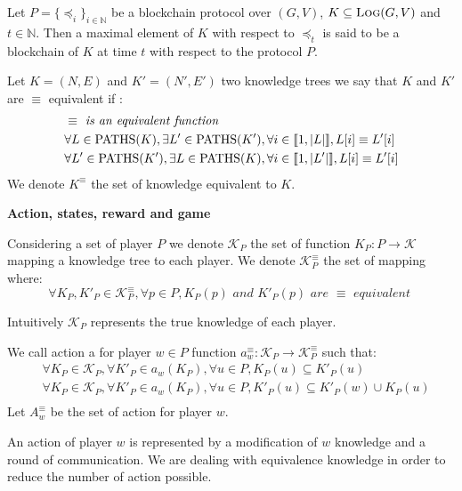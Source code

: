 
\begin{mydef}
Let $P = \{ \preceq_i\}_{i \in \mathbb{N}}$ be a blockchain protocol over $(G,V)$, $K \subseteq \text{\sc Log}(G,V)$ and $t \in \mathbb{N}$. 
Then a maximal element of $K$ with respect to $\preceq_t$ is said to be a blockchain of $K$ at time $t$ with respect to the protocol $P$.
\end{mydef}



\begin{mydef}
	Let $K = (N,E)$ and $K'=(N',E')$ two knowledge trees we say that $K$ and $K'$ are $\equiv$ equivalent if :
	\begin{eqnarray*}
		& \equiv \textit{ is an equivalent function} \\
		& \forall L \in \text{PATHS}(K), \exists L' \in \text{PATHS}(K'), \forall i \in \llbracket 1,|L| \rrbracket, L[i] \equiv L'[i] \\
		& \forall L' \in \text{PATHS}(K'), \exists L \in \text{PATHS}(K), \forall i \in \llbracket 1,|L'| \rrbracket, L[i] \equiv L'[i] \\
	\end{eqnarray*}	
	We denote $K^{\equiv}$ the set of knowledge equivalent to $K$. 
\end{mydef}


\medskip
\noindent
\textbf{Action, states, reward and game}
\begin{mydef}
	Considering a set of player $P$ we denote $\mathcal{K}_P$ the set of function $K_P : P \rightarrow \mathcal{K}$ mapping a knowledge tree to each player. 
	We denote $\mathcal{K}^{\equiv}_P$ the set of mapping where:
	$$\forall K_P, K'_P \in \mathcal{K}^{\equiv}_P, \forall p \in P, K_P(p) \textit{ and } K'_P(p) \textit{ are } \equiv \textit{ equivalent } $$ 
\end{mydef}

Intuitively $\mathcal{K}_P$ represents the true knowledge of each player.

\begin{mydef}
	We call action a for player $w\in P$ function $a^\equiv_w: \mathcal{K}_P \rightarrow \mathcal{K}_P^{\equiv}$ such that: 
	\begin{eqnarray*}	
		&\forall K_P \in \mathcal{K}_P, \forall K'_P \in a_w(K_P),  \forall u \in P, K_P(u) \subseteq K'_P(u)  \\
		&\forall K_P \in \mathcal{K}_P, \forall K'_P \in a_w(K_P), \forall u \in P, K'_P(u) \subseteq K'_P(w) \cup K_P(u)  \\
	\end{eqnarray*}
	Let $A^\equiv_w$ be the set of action for player $w$.
\end{mydef}
An action of player $w$ is represented by a modification of $w$ knowledge and a round of communication. We are dealing with equivalence knowledge in order to reduce the number of action possible.

